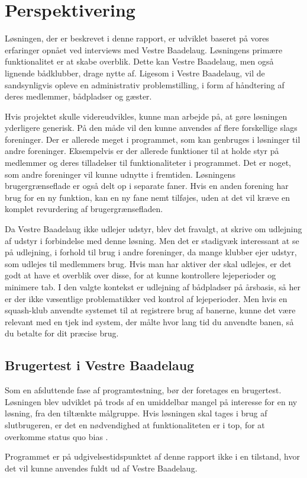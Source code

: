\chapter{Perspektivering}
\label{cha:perspektivering}

Løsningen, der er beskrevet i denne rapport, er udviklet baseret på vores erfaringer opnået ved interviews med Vestre Baadelaug. Løsningens primære funktionalitet er at skabe overblik. Dette kan Vestre Baadelaug, men også lignende bådklubber, drage nytte af. Ligesom i Vestre Baadelaug, vil de sandsynligvis opleve en administrativ problemstilling, i form af håndtering af deres medlemmer, bådpladser og gæster.

Hvis projektet skulle videreudvikles, kunne man arbejde på, at gøre løsningen yderligere generisk. På den måde vil den kunne anvendes af flere forskellige slags foreninger. Der er allerede meget i programmet, som kan genbruges i løsninger til andre foreninger. Eksempelvis er der allerede funktioner til at holde styr på medlemmer og deres tilladelser til funktionaliteter i programmet. Det er noget, som andre foreninger vil kunne udnytte i fremtiden. Løsningens brugergrænseflade er også delt op i separate faner. Hvis en anden forening har brug for en ny funktion, kan en ny fane nemt tilføjes, uden at det vil kræve en komplet revurdering af brugergrænsefladen.

Da Vestre Baadelaug ikke udlejer udstyr, blev det fravalgt, at skrive om udlejning af udstyr i forbindelse med denne løsning. Men det er stadigvæk interessant at se på udlejning, i forhold til brug i andre foreninger, da mange klubber ejer udstyr, som udlejes til medlemmers brug. Hvis man har aktiver der skal udlejes, er det godt at have et overblik over disse, for at kunne kontrollere lejeperioder og minimere tab. I den valgte kontekst er udlejning af bådpladser på årsbasis, så her er der ikke væsentlige problematikker ved kontrol af lejeperioder. Men hvis en squash-klub anvendte systemet til at registrere brug af banerne, kunne det være relevant med en tjek ind system, der målte hvor lang tid du anvendte banen, så du betalte for dit præcise brug.

\section{Brugertest i Vestre Baadelaug}

Som en afsluttende fase af programtestning, bør der foretages en brugertest. Løsningen blev udviklet på trods af en umiddelbar mangel på interesse for en ny løsning, fra den tiltænkte målgruppe. Hvis løsningen skal tages i brug af slutbrugeren, er det en nødvendighed at funktionaliteten er i top, for at overkomme status quo bias \cite{statusquo}.

Programmet er på udgivelsestidspunktet af denne rapport ikke i en tilstand, hvor det vil kunne anvendes fuldt ud af Vestre Baadelaug.